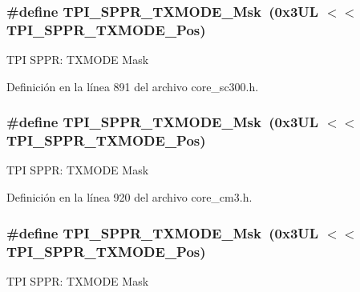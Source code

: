 \subsubsection[{\texorpdfstring{T\+P\+I\+\_\+\+S\+P\+P\+R\+\_\+\+T\+X\+M\+O\+D\+E\+\_\+\+Msk}{TPI_SPPR_TXMODE_Msk}}]{\setlength{\rightskip}{0pt plus 5cm}\#define T\+P\+I\+\_\+\+S\+P\+P\+R\+\_\+\+T\+X\+M\+O\+D\+E\+\_\+\+Msk~(0x3\+U\+L $<$$<$ T\+P\+I\+\_\+\+S\+P\+P\+R\+\_\+\+T\+X\+M\+O\+D\+E\+\_\+\+Pos)}\hypertarget{group___c_m_s_i_s___t_p_i_gaca085c8a954393d70dbd7240bb02cc1f}{}\label{group___c_m_s_i_s___t_p_i_gaca085c8a954393d70dbd7240bb02cc1f}
T\+PI S\+P\+PR\+: T\+X\+M\+O\+DE Mask 

Definición en la línea 891 del archivo core\+\_\+sc300.\+h.

\subsubsection[{\texorpdfstring{T\+P\+I\+\_\+\+S\+P\+P\+R\+\_\+\+T\+X\+M\+O\+D\+E\+\_\+\+Msk}{TPI_SPPR_TXMODE_Msk}}]{\setlength{\rightskip}{0pt plus 5cm}\#define T\+P\+I\+\_\+\+S\+P\+P\+R\+\_\+\+T\+X\+M\+O\+D\+E\+\_\+\+Msk~(0x3\+U\+L $<$$<$ T\+P\+I\+\_\+\+S\+P\+P\+R\+\_\+\+T\+X\+M\+O\+D\+E\+\_\+\+Pos)}\hypertarget{group___c_m_s_i_s___t_p_i_gaca085c8a954393d70dbd7240bb02cc1f}{}\label{group___c_m_s_i_s___t_p_i_gaca085c8a954393d70dbd7240bb02cc1f}
T\+PI S\+P\+PR\+: T\+X\+M\+O\+DE Mask 

Definición en la línea 920 del archivo core\+\_\+cm3.\+h.

\subsubsection[{\texorpdfstring{T\+P\+I\+\_\+\+S\+P\+P\+R\+\_\+\+T\+X\+M\+O\+D\+E\+\_\+\+Msk}{TPI_SPPR_TXMODE_Msk}}]{\setlength{\rightskip}{0pt plus 5cm}\#define T\+P\+I\+\_\+\+S\+P\+P\+R\+\_\+\+T\+X\+M\+O\+D\+E\+\_\+\+Msk~(0x3\+U\+L $<$$<$ T\+P\+I\+\_\+\+S\+P\+P\+R\+\_\+\+T\+X\+M\+O\+D\+E\+\_\+\+Pos)}\hypertarget{group___c_m_s_i_s___t_p_i_gaca085c8a954393d70dbd7240bb02cc1f}{}\label{group___c_m_s_i_s___t_p_i_gaca085c8a954393d70dbd7240bb02cc1f}
T\+PI S\+P\+PR\+: T\+X\+M\+O\+DE Mask 

